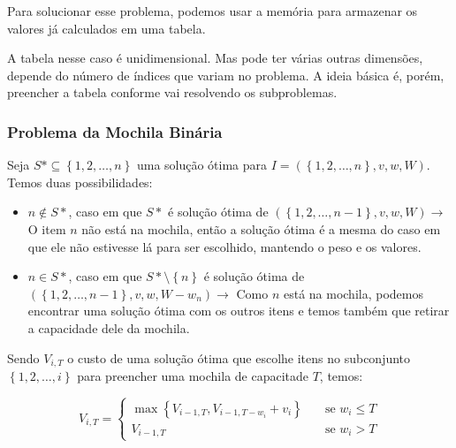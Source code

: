 Para solucionar esse problema, podemos usar a memória para armazenar os valores já calculados em uma tabela.

\begin{algorithm}
	\SetAlgoLined
\end{algorithm}

A tabela nesse caso é unidimensional. Mas pode ter várias outras dimensões, depende do número de índices que variam no problema. A ideia básica é, porém, preencher a tabela conforme vai resolvendo os subproblemas.

\subsubsection{Problema da Mochila Binária}

Seja $S* \subseteq \left\{ 1, 2, \dots, n\right\}$ uma solução ótima para $I = (\left\{ 1, 2, \dots, n\right\}, v, w, W)$. Temos duas possibilidades:

\begin{itemize}
	\item $n \notin S*$, caso em que $S*$ é solução ótima de $(\left\{ 1, 2, \dots, n-1\right\}, v, w, W) \rightarrow$ O item $n$ não está na mochila, então a solução ótima é a mesma do caso em que ele não estivesse lá para ser escolhido, mantendo o peso e os valores.
	\item $n \in S*$, caso em que $S* \setminus \left\{ n\right\}$ é solução ótima de $(\left\{ 1, 2, \dots, n-1\right\}, v, w, W-w_n) \rightarrow$ Como $n$ está na mochila, podemos encontrar uma solução ótima com os outros itens e temos também que retirar a capacidade dele da mochila.
\end{itemize}

Sendo $V_{i, T}$ o custo de uma solução ótima que escolhe itens no subconjunto $\left\{ 1, 2, \dots, i\right\}$ para preencher uma mochila de capacitade $T$, temos:

\[
	V_{i,T} =
	\begin{cases}
		\max\left\{ V_{i-1, T}, V_{i-1, T-w_i} + v_i\right\} & \quad \text{se } w_i \leq T \\
		V_{i-1, T}                                           & \quad \text{se } w_i > T
	\end{cases}
\]

